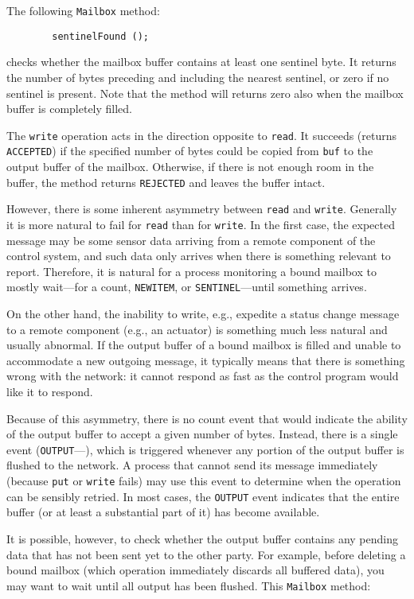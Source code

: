 The following {\tt Mailbox} method:
\begin{verbatim}
        sentinelFound ();
\end{verbatim}
checks whether the mailbox buffer contains at least one
sentinel byte.
It returns the number of bytes preceding and including the nearest
sentinel, or zero if no sentinel is present.
Note that the method will returns zero also when the mailbox buffer is
completely filled.

\medskip

The {\tt write} operation acts in the direction opposite to {\tt read}.
It succeeds (returns {\tt ACCEPTED}) if the specified number of bytes could
be copied from {\tt buf} to the output buffer of the mailbox.
Otherwise, if there is not enough room in the buffer,
the method returns {\tt REJECTED} and leaves the buffer intact.

However, there is some inherent asymmetry between {\tt read} and {\tt write}.
Generally it is more natural to fail for {\tt read} than for {\tt write}.
In the first case,
the expected message may be some sensor data arriving from a remote
component of the control system, and such data only arrives when there is
something relevant to report.
Therefore, it is natural for a process monitoring a bound mailbox to
mostly wait---for a count, {\tt NEWITEM}, or {\tt SENTINEL}---until
something arrives.

On the other hand, the inability to write, e.g.,
expedite a status change message to
a remote component (e.g., an actuator) is something much less natural
and usually abnormal.
If the output buffer of a bound mailbox is filled and unable to accommodate
a new outgoing message, it typically means that there is something wrong
with the network: it cannot respond as fast as the control program
would like it to respond.

Because of this asymmetry, there is no count event that would indicate the
ability of the output buffer to accept a given number of bytes.
Instead, there is a single event ({\tt OUTPUT}---), which
is triggered whenever any portion of the output buffer is flushed to the
network.
A process that cannot send its message immediately
(because {\tt put} or {\tt write} fails)
may use this event to determine when the operation can be sensibly retried.
In most cases, the {\tt OUTPUT} event indicates that the entire buffer
(or at least a substantial part of it) has become available.

It is possible, however, to check whether the output buffer contains any
pending data that has not been sent yet to the other party.
For example, before deleting a bound mailbox (which operation immediately
discards all buffered data), you may want to wait until all output has been
flushed.
This {\tt Mailbox} method:

